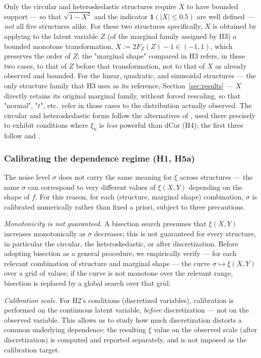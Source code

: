 \documentclass[article]{ajs}
\begin{document}
Only the circular and heteroskedastic structures require $X$ to have
bounded support --- so that $\sqrt{1-X^2}$ and the indicator
$\mathbf{1}(|X|\le 0.5)$ are well defined --- \emph{not} all five
structures alike. For these two structures specifically, $X$ is
obtained by applying to the latent variable $Z$ (of the marginal
family assigned by H3) a bounded monotone transformation, $X := 2F_Z(Z)-1
\in (-1,1)$, which preserves the order of $Z$; the "marginal shape"
compared in H3 refers, in these two cases, to that of $Z$ before that
transformation, not to that of $X$ as already observed and bounded.
For the linear, quadratic, and sinusoidal structures --- the only
structure family that H3 uses as its reference,
Section~\ref{sec:results} --- $X$ directly retains its original
marginal family, without forced rescaling, so that "normal", "$t$",
etc.\ refer in those cases to the distribution actually observed. The
circular and heteroskedastic forms follow the alternatives of
\citet[Section 4.3]{chatterjee2021}, used there precisely to exhibit
conditions where $\xi_n$ is \emph{less} powerful than dCor (H4); the
first three follow \citet{dalitz2024} and \citet{gao2024}.

\subsubsection{Calibrating the dependence regime (H1, H5a)}

The noise level $\sigma$ does not carry the same meaning for $\xi$
across structures --- the same $\sigma$ can correspond to very
different values of $\xi(X,Y)$ depending on the shape of $f$. For this
reason, for each (structure, marginal shape) combination, $\sigma$ is
calibrated numerically rather than fixed a priori, subject to three
precautions.

\emph{Monotonicity is not guaranteed.} A bisection search presumes
that $\xi(X,Y)$ increases monotonically as $\sigma$ decreases; this is
not guaranteed for every structure, in particular the circular, the
heteroskedastic, or after discretization. Before adopting bisection as
a general procedure, we empirically verify --- for each relevant
combination of structure and marginal shape --- the curve
$\sigma \mapsto \xi(X,Y)$ over a grid of values; if the curve is not
monotone over the relevant range, bisection is replaced by a global
search over that grid.

\emph{Calibration scale.} For H2's conditions (discretized variables),
calibration is performed on the continuous latent variable,
\emph{before} discretization --- not on the observed variable. This
allows us to study how much discretization distorts a common
underlying dependence; the resulting $\xi$ value on the observed scale
(after discretization) is computed and reported separately, and is not
imposed as the calibration target.
\end{document}
